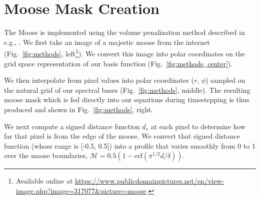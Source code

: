 \section{Moose Mask Creation}
\label{app:mask}

The Moose is implemented using the volume penalization method described in e.g., \citet{hester_etal_2021}.
We first take an image of a majestic moose from the internet (Fig.~\ref{fig:methods}, left\footnote{Available online at \url{https://www.publicdomainpictures.net/en/view-image.php?image=317077&picture=moose}.}).
We convert this image into polar coordinates on the grid space representation of our basis function (Fig.~\ref{fig:methods, center}).

We then interpolate from pixel values into polar coordinates ($r$, $\phi$) sampled on the natural grid of our spectral bases (Fig.~\ref{fig:methods}, middle).
The resulting moose mask which is fed directly into our equations during timestepping is thus produced and shown in Fig.~\ref{fig:methods}, right.

We next compute a signed distance function $d_s$ at each pixel to determine how far that pixel is from the edge of the moose.
We convert that signed distance function (whose range is [-0.5, 0.5]) into a profile that varies smoothly from 0 to 1 over the moose boundaries, $\mathcal{M} = 0.5(1 - \mathrm{erf}(\pi^{1/2}d/\delta))$.

